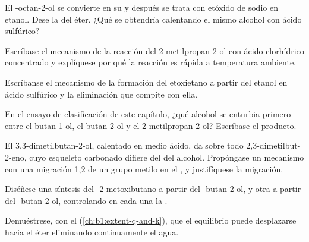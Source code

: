 \begin{exercise}[$\star\star$]\label{exo:b1:alcohol-activation:6}
El -octan-2-ol se convierte en su  y después se trata con
etóxido de sodio en etanol. Dese la  del éter. ¿Qué se
obtendría calentando el mismo alcohol con ácido sulfúrico?
\end{exercise}

\begin{exercise}[$\star\star$]\label{exo:b1:alcohol-activation:7}
Escríbase el mecanismo de la reacción del 2-metilpropan-2-ol con ácido
clorhídrico concentrado y explíquese por qué la reacción es rápida a
temperatura ambiente.
\end{exercise}

\begin{exercise}[$\star\star$]\label{exo:b1:alcohol-activation:8}
Escríbanse el mecanismo de la formación del etoxietano a partir del
etanol en ácido sulfúrico y la eliminación que compite con ella.
\end{exercise}

\begin{exercise}[$\star\star$]\label{exo:b1:alcohol-activation:9}
En el ensayo de clasificación de este capítulo, ¿qué alcohol se enturbia
primero entre el butan-1-ol, el butan-2-ol y el 2-metilpropan-2-ol?
Escríbase el producto.
\end{exercise}

\begin{exercise}[$\star\star\star$]\label{exo:b1:alcohol-activation:10}
El 3,3-dimetilbutan-2-ol, calentado en medio ácido, da sobre todo
2,3-dimetilbut-2-eno, cuyo esqueleto carbonado difiere del del alcohol.
Propóngase un mecanismo con una migración 1,2 de un grupo metilo en el
, y justifíquese la migración.
\end{exercise}

\begin{exercise}[$\star\star\star$]\label{exo:b1:alcohol-activation:11}
Diséñese una síntesis del -2-metoxibutano a partir del
-butan-2-ol, y otra a partir del -butan-2-ol, controlando en
cada una la .
\end{exercise}

\begin{exercise}[$\star\star\star$]\label{exo:b1:alcohol-activation:12}
Demuéstrese, con el  (\cref{ch:b1:extent-q-and-k}),
que el equilibrio  puede desplazarse
hacia el éter eliminando continuamente el agua.
\end{exercise}

